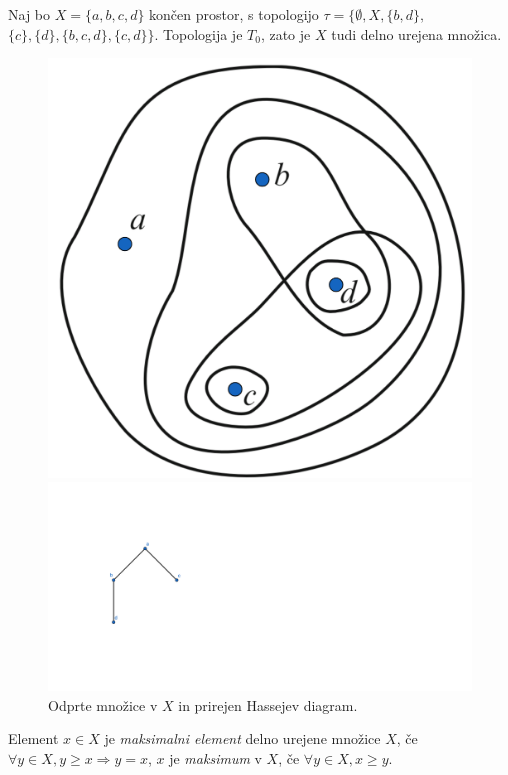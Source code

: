\documentclass[mat1]{fmfdelo}
\begin{document}
\begin{primer}
    Naj bo $X=\{a,b,c,d\}$ končen prostor, s topologijo 
    $\tau=\{\emptyset,X,\{b,d\},$ $\{c\},\{d\},\{b,c,d\},
    \{c,d\}\}$. Topologija je $T_0$, zato je $X$ tudi delno 
    urejena množica.
\begin{figure}[h!]
    \centering
    \begin{minipage}{0.5\textwidth}
        \centering
        \includegraphics[width=0.6\linewidth]{open.png}
    \end{minipage}%
    \begin{minipage}{0.5\textwidth}
        \centering
        \includegraphics[width=2.5\linewidth]{hasse.png}
    \end{minipage}
    \caption{Odprte množice v $X$ in prirejen Hassejev diagram.}
\end{figure}


\end{primer}

\begin{definicija}
    Element $x\in X$ je \textit{maksimalni element} delno urejene množice $X$, če $\forall y \in X, y\geq x \Rightarrow y = x$,
    $x$ je \textit{maksimum} v $X$, če $\forall y \in X, x\geq y$.
\end{definicija}
\end{document}

